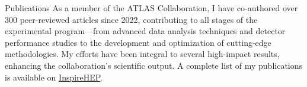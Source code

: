 \documentclass[11pt]{resume} %
\begin{document}
    \begin{rSection}{Publications}
        As a member of the ATLAS Collaboration, I have co-authored over 300 peer-reviewed articles since 2022, 
        contributing to all stages of the experimental program—from advanced data analysis techniques and detector 
        performance studies to the development and optimization of cutting-edge methodologies. 
        My efforts have been integral to several high-impact results, enhancing the collaboration's 
        scientific output. A complete list of my publications is available on \href{https://inspirehep.net/authors/2164455}{InspireHEP}.

        \printbibliography[heading=subbibliography,type=article,title={ATLAS Publications (Major Contributions)}]
        \printbibliography[heading=subbibliography,type=thesis,title={PhD Thesis}]

        
    \end{rSection}
\end{document}

